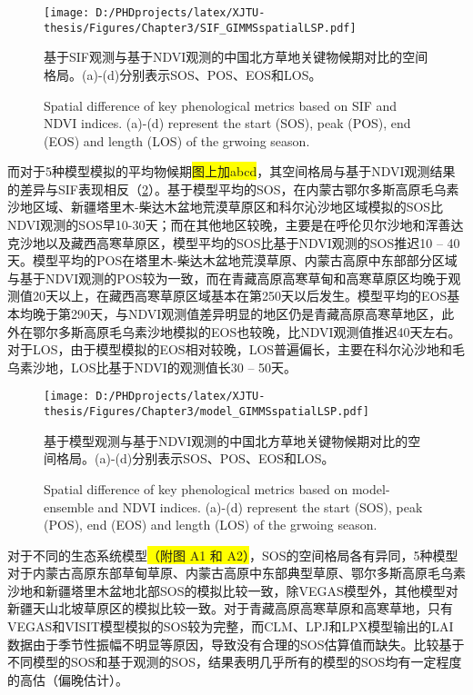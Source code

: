 \begin{figure}[h]
  \centering
  \texttt{[image: D:/PHDprojects/latex/XJTU-thesis/Figures/Chapter3/SIF\_GIMMSspatialLSP.pdf]}
  \caption{基于SIF观测与基于NDVI观测的中国北方草地关键物候期对比的空间格局。(a)-(d)分别表示SOS、POS、EOS和LOS。}
  \addtocounter{figure}{-1}
  \vspace{5pt}
  \renewcommand{\figurename}{Fig}
  \caption{Spatial difference of key phenological metrics based on SIF and NDVI indices. (a)-(d) represent the start (SOS), peak (POS), end (EOS) and length (LOS) of the grwoing season.}
  \label{figure41}
\end{figure}

而对于5种模型模拟的平均物候期\colorbox{yellow}{图上加abcd}，其空间格局与基于NDVI观测结果的差异与SIF表现相反（\cref{figure42}）。基于模型平均的SOS，在内蒙古鄂尔多斯高原毛乌素沙地区域、新疆塔里木-柴达木盆地荒漠草原区和科尔沁沙地区域模拟的SOS比NDVI观测的SOS早10-30天；而在其他地区较晚，主要是在呼伦贝尔沙地和浑善达克沙地以及藏西高寒草原区，模型平均的SOS比基于NDVI观测的SOS推迟10 – 40天。模型平均的POS在塔里木-柴达木盆地荒漠草原、内蒙古高原中东部部分区域与基于NDVI观测的POS较为一致，而在青藏高原高寒草甸和高寒草原区均晚于观测值20天以上，在藏西高寒草原区域基本在第250天以后发生。模型平均的EOS基本均晚于第290天，与NDVI观测值差异明显的地区仍是青藏高原高寒草地区，此外在鄂尔多斯高原毛乌素沙地模拟的EOS也较晚，比NDVI观测值推迟40天左右。对于LOS，由于模型模拟的EOS相对较晚，LOS普遍偏长，主要在科尔沁沙地和毛乌素沙地，LOS比基于NDVI的观测值长30 – 50天。

\begin{figure}[h]
  \centering
  \texttt{[image: D:/PHDprojects/latex/XJTU-thesis/Figures/Chapter3/model\_GIMMSspatialLSP.pdf]}
  \caption{基于模型观测与基于NDVI观测的中国北方草地关键物候期对比的空间格局。(a)-(d)分别表示SOS、POS、EOS和LOS。}
  \addtocounter{figure}{-1}
  \vspace{5pt}
  \renewcommand{\figurename}{Fig}
  \caption{Spatial difference of key phenological metrics based on model-ensemble and NDVI indices. (a)-(d) represent the start (SOS), peak (POS), end (EOS) and length (LOS) of the grwoing season.}
  \label{figure42}
\end{figure}

对于不同的生态系统模型\colorbox{yellow}{（附图 A1 和 A2）}，SOS的空间格局各有异同，5种模型对于内蒙古高原东部草甸草原、内蒙古高原中东部典型草原、鄂尔多斯高原毛乌素沙地和新疆塔里木盆地北部SOS的模拟比较一致，除VEGAS模型外，其他模型对新疆天山北坡草原区的模拟比较一致。对于青藏高原高寒草原和高寒草地，只有VEGAS和VISIT模型模拟的SOS较为完整，而CLM、LPJ和LPX模型输出的LAI数据由于季节性振幅不明显等原因，导致没有合理的SOS估算值而缺失。比较基于不同模型的SOS和基于观测的SOS，结果表明几乎所有的模型的SOS均有一定程度的高估（偏晚估计）。

